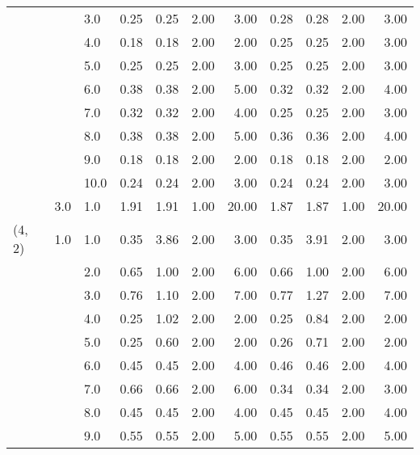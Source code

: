 \begin{tabular}{lllrrrrrrrr}
       &     & 3.0  &       0.25 &      0.25 & 2.00 &   3.00 &       0.28 &      0.28 & 2.00 &   3.00 \\
       &     & 4.0  &       0.18 &      0.18 & 2.00 &   2.00 &       0.25 &      0.25 & 2.00 &   3.00 \\
       &     & 5.0  &       0.25 &      0.25 & 2.00 &   3.00 &       0.25 &      0.25 & 2.00 &   3.00 \\
       &     & 6.0  &       0.38 &      0.38 & 2.00 &   5.00 &       0.32 &      0.32 & 2.00 &   4.00 \\
       &     & 7.0  &       0.32 &      0.32 & 2.00 &   4.00 &       0.25 &      0.25 & 2.00 &   3.00 \\
       &     & 8.0  &       0.38 &      0.38 & 2.00 &   5.00 &       0.36 &      0.36 & 2.00 &   4.00 \\
       &     & 9.0  &       0.18 &      0.18 & 2.00 &   2.00 &       0.18 &      0.18 & 2.00 &   2.00 \\
       &     & 10.0 &       0.24 &      0.24 & 2.00 &   3.00 &       0.24 &      0.24 & 2.00 &   3.00 \\
       & 3.0 & 1.0  &       1.91 &      1.91 & 1.00 &  20.00 &       1.87 &      1.87 & 1.00 &  20.00 \\
(4, 2) & 1.0 & 1.0  &       0.35 &      3.86 & 2.00 &   3.00 &       0.35 &      3.91 & 2.00 &   3.00 \\
       &     & 2.0  &       0.65 &      1.00 & 2.00 &   6.00 &       0.66 &      1.00 & 2.00 &   6.00 \\
       &     & 3.0  &       0.76 &      1.10 & 2.00 &   7.00 &       0.77 &      1.27 & 2.00 &   7.00 \\
       &     & 4.0  &       0.25 &      1.02 & 2.00 &   2.00 &       0.25 &      0.84 & 2.00 &   2.00 \\
       &     & 5.0  &       0.25 &      0.60 & 2.00 &   2.00 &       0.26 &      0.71 & 2.00 &   2.00 \\
       &     & 6.0  &       0.45 &      0.45 & 2.00 &   4.00 &       0.46 &      0.46 & 2.00 &   4.00 \\
       &     & 7.0  &       0.66 &      0.66 & 2.00 &   6.00 &       0.34 &      0.34 & 2.00 &   3.00 \\
       &     & 8.0  &       0.45 &      0.45 & 2.00 &   4.00 &       0.45 &      0.45 & 2.00 &   4.00 \\
       &     & 9.0  &       0.55 &      0.55 & 2.00 &   5.00 &       0.55 &      0.55 & 2.00 &   5.00 \\

\end{tabular}
